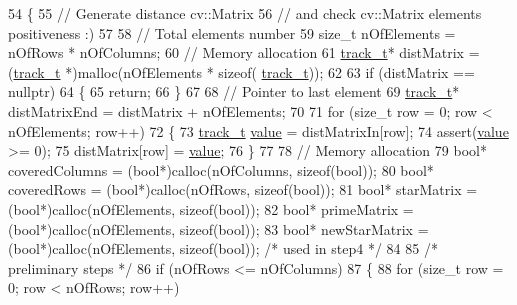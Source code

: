\begin{DoxyCode}
54 \{
55     \textcolor{comment}{// Generate distance cv::Matrix }
56     \textcolor{comment}{// and check cv::Matrix elements positiveness :)}
57 
58     \textcolor{comment}{// Total elements number}
59     \textcolor{keywordtype}{size\_t} nOfElements = nOfRows * nOfColumns;
60     \textcolor{comment}{// Memory allocation}
61     \mbox{\hyperlink{defines_8h_a7ce9c8817b42ab418e61756f579549ab}{track\_t}}* distMatrix = (\mbox{\hyperlink{defines_8h_a7ce9c8817b42ab418e61756f579549ab}{track\_t}} *)malloc(nOfElements * \textcolor{keyword}{sizeof}(
      \mbox{\hyperlink{defines_8h_a7ce9c8817b42ab418e61756f579549ab}{track\_t}}));
62 
63     \textcolor{keywordflow}{if} (distMatrix == \textcolor{keyword}{nullptr})
64     \{
65         \textcolor{keywordflow}{return};
66     \}
67 
68     \textcolor{comment}{// Pointer to last element}
69     \mbox{\hyperlink{defines_8h_a7ce9c8817b42ab418e61756f579549ab}{track\_t}}* distMatrixEnd = distMatrix + nOfElements;
70 
71     \textcolor{keywordflow}{for} (\textcolor{keywordtype}{size\_t} row = 0; row < nOfElements; row++)
72     \{
73         \mbox{\hyperlink{defines_8h_a7ce9c8817b42ab418e61756f579549ab}{track\_t}} \mbox{\hyperlink{struct_g_m_l__token_a50b20988e3fe419332313e8d9e02c775}{value}} = distMatrixIn[row];
74         assert(\mbox{\hyperlink{struct_g_m_l__token_a50b20988e3fe419332313e8d9e02c775}{value}} >= 0);
75         distMatrix[row] = \mbox{\hyperlink{struct_g_m_l__token_a50b20988e3fe419332313e8d9e02c775}{value}};
76     \}
77 
78     \textcolor{comment}{// Memory allocation}
79     \textcolor{keywordtype}{bool}* coveredColumns = (\textcolor{keywordtype}{bool}*)calloc(nOfColumns, \textcolor{keyword}{sizeof}(\textcolor{keywordtype}{bool}));
80     \textcolor{keywordtype}{bool}* coveredRows = (\textcolor{keywordtype}{bool}*)calloc(nOfRows, \textcolor{keyword}{sizeof}(\textcolor{keywordtype}{bool}));
81     \textcolor{keywordtype}{bool}* starMatrix = (\textcolor{keywordtype}{bool}*)calloc(nOfElements, \textcolor{keyword}{sizeof}(\textcolor{keywordtype}{bool}));
82     \textcolor{keywordtype}{bool}* primeMatrix = (\textcolor{keywordtype}{bool}*)calloc(nOfElements, \textcolor{keyword}{sizeof}(\textcolor{keywordtype}{bool}));
83     \textcolor{keywordtype}{bool}* newStarMatrix = (\textcolor{keywordtype}{bool}*)calloc(nOfElements, \textcolor{keyword}{sizeof}(\textcolor{keywordtype}{bool})); \textcolor{comment}{/* used in step4 */}
84 
85     \textcolor{comment}{/* preliminary steps */}
86     \textcolor{keywordflow}{if} (nOfRows <= nOfColumns)
87     \{
88         \textcolor{keywordflow}{for} (\textcolor{keywordtype}{size\_t} row = 0; row < nOfRows; row++)

\end{DoxyCode}

